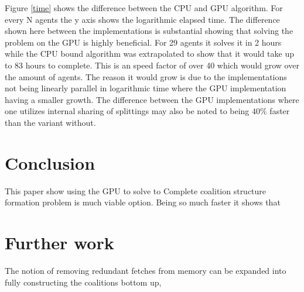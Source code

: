 \documentclass{aamas2012}
\begin{document}
Figure \ref{time} shows the difference between the CPU and GPU algorithm.
For every N agents the y axis shows the logarithmic elapsed time. The difference shown here between the implementations is substantial showing
that solving the problem on the GPU is highly beneficial. For 29 agents it solves it in 2 hours while the CPU bound algorithm was extrapolated to show that it would take up to 83 hours to complete. This is an speed factor of over 40 which would grow over the amount of agents. The reason it would grow is due to the implementations not being linearly parallel in logarithmic time where the GPU implementation having a smaller growth.
The difference between the GPU implementations where one utilizes internal 
sharing of splittings may also be noted to being $40\%$ faster than the variant without.
\section{Conclusion}
This paper show using the GPU to solve to Complete coalition structure formation problem is much viable option. 
Being so much faster it shows that

\section{Further work}
The notion of removing redundant fetches from memory can be expanded into fully constructing the coalitions bottom up,
% 
\end{document}
